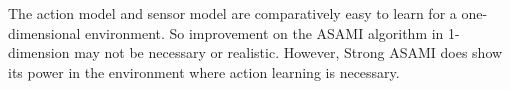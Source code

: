 \documentclass[10pt]{article}
\begin{document}
The action model and sensor model are comparatively easy to learn for
a one-dimensional environment. So improvement on the ASAMI algorithm in
1-dimension may not be necessary or realistic. However, Strong ASAMI
does show its power in the environment where action learning is
necessary.




\end{document}
